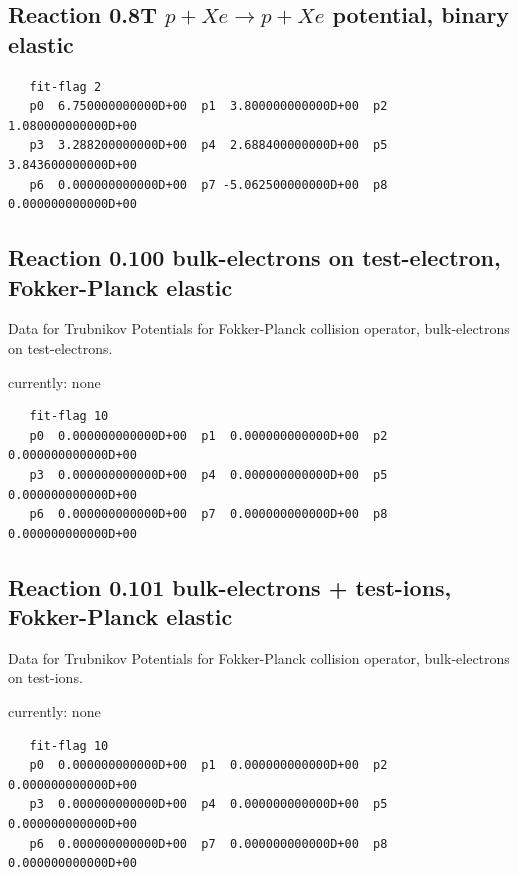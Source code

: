 \documentclass[12pt,dvips]{article}
\begin{document}
\newpage

\subsection{
Reaction 0.8T   $ p + Xe \rightarrow p + Xe $ potential, binary elastic }

\begin{small}\begin{verbatim}
   fit-flag 2
   p0  6.750000000000D+00  p1  3.800000000000D+00  p2  1.080000000000D+00
   p3  3.288200000000D+00  p4  2.688400000000D+00  p5  3.843600000000D+00
   p6  0.000000000000D+00  p7 -5.062500000000D+00  p8  0.000000000000D+00
\end{verbatim}\end{small}


\newpage

\subsection{
Reaction 0.100  bulk-electrons on test-electron, Fokker-Planck elastic }
Data for Trubnikov Potentials for Fokker-Planck collision
operator, bulk-electrons on test-electrons.

currently: none


\begin{small}\begin{verbatim}
   fit-flag 10
   p0  0.000000000000D+00  p1  0.000000000000D+00  p2  0.000000000000D+00
   p3  0.000000000000D+00  p4  0.000000000000D+00  p5  0.000000000000D+00
   p6  0.000000000000D+00  p7  0.000000000000D+00  p8  0.000000000000D+00
\end{verbatim}\end{small}

\subsection{
Reaction 0.101   bulk-electrons + test-ions, Fokker-Planck elastic }
Data for Trubnikov Potentials for Fokker-Planck collision
operator, bulk-electrons on test-ions.

currently: none


\begin{small}\begin{verbatim}
   fit-flag 10
   p0  0.000000000000D+00  p1  0.000000000000D+00  p2  0.000000000000D+00
   p3  0.000000000000D+00  p4  0.000000000000D+00  p5  0.000000000000D+00
   p6  0.000000000000D+00  p7  0.000000000000D+00  p8  0.000000000000D+00
\end{verbatim}\end{small}
\end{document}
